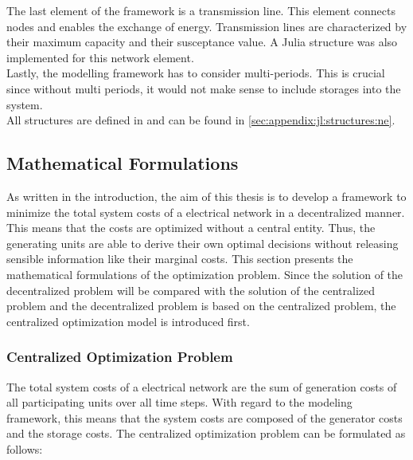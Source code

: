 The last element of the framework is a transmission line. This element connects nodes and enables the exchange of energy. Transmission lines are characterized by their maximum capacity and their susceptance value. A Julia structure was also implemented for this network element.\\

Lastly, the modelling framework has to consider multi-periods. This is crucial since without multi periods, it would not make sense to include storages into the system.\\

All structures are defined in  and can be found in \ref{sec:appendix:jl:structures:ne}.


\subsection{Mathematical Formulations}
\label{sec:app:math-form}

As written in the introduction, the aim of this thesis is to develop a framework to minimize the total system costs of a electrical network in a decentralized manner. This means that the costs are optimized without a central entity. Thus, the generating units are able to derive their own optimal decisions without releasing sensible information like their marginal costs. This section presents the mathematical formulations of the optimization problem. Since the solution of the decentralized problem will be compared with the solution of the centralized problem and the decentralized problem is based on the centralized problem, the centralized optimization model is introduced first.

\subsubsection{Centralized Optimization Problem}

The total system costs of a electrical network are the sum of generation costs of all participating units over all time steps. With regard to the modeling framework, this means that the system costs are composed of the generator costs and the storage costs. The centralized optimization problem can be formulated as follows:

